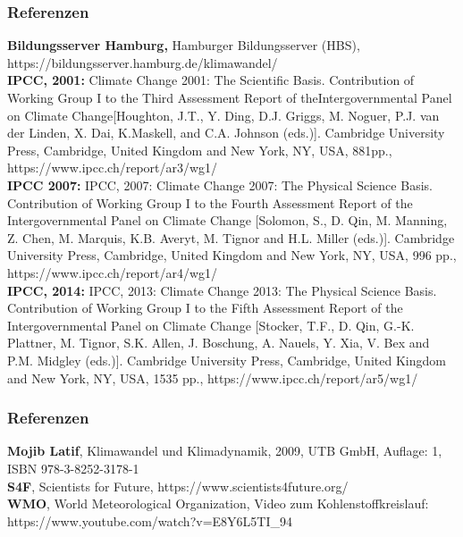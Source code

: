 \begin{frame}
	\frametitle{Referenzen}
	\small{
	\textbf{Bildungsserver Hamburg,} Hamburger Bildungsserver (HBS), https://bildungsserver.hamburg.de/klimawandel/ \\
	
	\textbf{IPCC, 2001:} Climate Change 2001: The Scientific Basis. Contribution of Working Group I to the Third Assessment Report of theIntergovernmental Panel on Climate Change[Houghton, J.T., Y. Ding, D.J. Griggs, M. Noguer, P.J. van der Linden, X. Dai, K.Maskell, and C.A. Johnson (eds.)]. Cambridge University Press, Cambridge, United Kingdom and New York, NY, USA, 881pp., https://www.ipcc.ch/report/ar3/wg1/\\
	
	\textbf{IPCC 2007:} IPCC, 2007: Climate Change 2007: The Physical Science Basis. Contribution of Working Group I to the Fourth Assessment Report of the Intergovernmental Panel on Climate Change [Solomon, S., D. Qin, M. Manning, Z. Chen, M. Marquis, K.B. Averyt, M. Tignor and H.L. Miller (eds.)]. Cambridge University Press, Cambridge, United Kingdom and New York, NY, USA, 996 pp.,  https://www.ipcc.ch/report/ar4/wg1/\\
	
	\textbf{IPCC, 2014:} IPCC, 2013: Climate Change 2013: The Physical Science Basis. Contribution of Working Group I to the Fifth Assessment Report of the Intergovernmental Panel on Climate Change [Stocker, T.F., D. Qin, G.-K. Plattner, M. Tignor, S.K. Allen, J. Boschung, A. Nauels, Y. Xia, V. Bex and P.M. Midgley (eds.)]. Cambridge University Press, Cambridge, United Kingdom and New York, NY, USA, 1535 pp., https://www.ipcc.ch/report/ar5/wg1/\\
	
	}
\end{frame}

\begin{frame}
	\frametitle{Referenzen}
	\small{
	\textbf{Mojib Latif}, Klimawandel und Klimadynamik, 2009, UTB GmbH, Auflage: 1, ISBN 978-3-8252-3178-1\\
	\textbf{S4F}, Scientists for Future, https://www.scientists4future.org/\\
	\textbf{WMO}, World Meteorological Organization, Video zum Kohlenstoffkreislauf: https://www.youtube.com/watch?v=E8Y6L5TI\_94
	}
\end{frame}